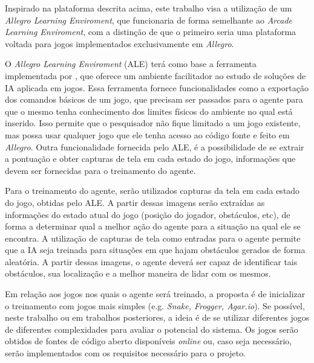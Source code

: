  Inspirado na plataforma descrita acima, este trabalho visa a utilização de um \textit{Allegro Learning Enviroment}, que funcionaria de forma semelhante ao \textit{Arcade Learning Enviroment}, com a distinção de que o primeiro seria uma plataforma voltada para jogos implementados exclusivamente em \textit{Allegro}.

 O \textit{Allegro Learning Enviroment} (ALE) terá como base a ferramenta implementada por \cite{silva:amb-jd-allegro}, que oferece um ambiente facilitador ao estudo de soluções de IA aplicada em jogos. Essa ferramenta fornece funcionalidades como a exportação dos comandos básicos de um jogo, que precisam ser passados para o agente para que o mesmo tenha conhecimento dos limites físicos do ambiente no qual está inserido. Isso permite que o pesquisador não fique limitado a um jogo existente, mas possa usar qualquer jogo que ele tenha acesso ao código fonte e feito em \textit{Allegro}. Outra funcionalidade fornecida pelo ALE, é a possibilidade de se extrair a pontuação e obter capturas de tela em cada estado do jogo, informações que devem ser fornecidas para o treinamento do agente.

 Para o treinamento do agente, serão utilizados capturas da tela em cada estado do jogo, obtidas pelo ALE. A partir dessas imagens serão extraídas  as informações do estado atual do jogo (posição do jogador, obstáculos, etc), de forma a determinar qual a melhor ação do agente para a situação na qual ele se encontra. A utilização de capturas de tela como entradas para o agente permite que a IA seja treinada para situações em que hajam obstáculos gerados de forma aleatória. A partir dessas imagens, o agente deverá ser capaz de identificar tais obstáculos, sua localização e a melhor maneira de lidar com os mesmos.

 Em relação aos jogos nos quais o agente será treinado, a proposta é de inicializar o treinamento com jogos mais simples (e.g. \textit{Snake, Frogger, Agar.io}). Se possível, neste trabalho ou em trabalhos posteriores, a ideia é de se utilizar diferentes jogos de diferentes complexidades para avaliar o potencial do sistema. Os jogos serão obtidos de fontes de código aberto disponíveis \textit{online} ou, caso seja necessário, serão implementados com os requisitos necessário para o projeto.



 



 




